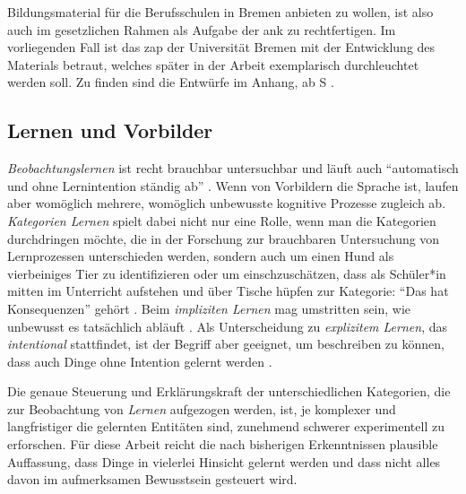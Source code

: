 Bildungsmaterial für die Berufsschulen in Bremen anbieten zu wollen, ist also auch im gesetzlichen Rahmen als Aufgabe der \gls{ank} zu rechtfertigen.
Im vorliegenden Fall ist das \gls{zap} der Universität Bremen mit der Entwicklung des Materials betraut, welches später in der Arbeit exemplarisch durchleuchtet werden soll. Zu finden sind die Entwürfe im Anhang, ab \gls{S} \pageref{MaterialkartenStart}. 


\subsection{Lernen und Vorbilder \label{lernen}}
\emph{Beobachtungslernen} ist recht brauchbar untersuchbar und läuft auch \enquote{automatisch und ohne Lernintention ständig ab} \autocites[81]{Kiesel2012}[\gls{vgl} zu den bekannteren Anfängen:][]{Bandura.1977}. Wenn von Vorbildern die Sprache ist, laufen aber womöglich mehrere, womöglich unbewusste kognitive Prozesse zugleich ab. \emph{Kategorien Lernen} spielt dabei nicht nur eine Rolle, wenn man die Kategorien durchdringen möchte, die in der Forschung zur brauchbaren Untersuchung von Lernprozessen unterschieden werden, sondern auch um einen Hund als vierbeiniges Tier zu identifizieren oder um einschzuschätzen, dass als Schüler*in mitten im Unterricht aufstehen und über Tische hüpfen zur Kategorie: \enquote{Das hat Konsequenzen} gehört \autocite[95]{Kiesel2012}. Beim \emph{impliziten Lernen} mag umstritten sein, wie unbewusst es tatsächlich abläuft \autocite[83]{Kiesel2012}. Als Unterscheidung zu \emph{explizitem Lernen}, das \emph{intentional} stattfindet, ist der Begriff aber geeignet, um beschreiben zu können, dass auch Dinge ohne Intention gelernt werden \autocite[84]{Kiesel2012}. 

Die genaue Steuerung und Erklärungskraft der unterschiedlichen Kategorien, die zur Beobachtung von \emph{Lernen} aufgezogen werden, ist, je komplexer und langfristiger die gelernten Entitäten sind, zunehmend schwerer experimentell zu erforschen. 
Für diese Arbeit reicht die nach bisherigen Erkenntnissen plausible Auffassung, dass Dinge in vielerlei Hinsicht gelernt werden und dass nicht alles davon im aufmerksamen Bewusstsein gesteuert wird. 


